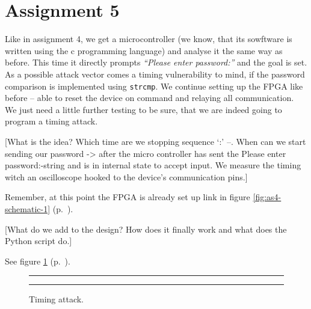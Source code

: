 \section*{Assignment 5}
%
% 

Like in assignment 4, we get a microcontroller (we know, that its sowftware is written using the c programming language) and analyse it the same way as before. 
This time it directly prompts \textit{``Please enter password:''} and the goal is set. As a possible attack vector comes a timing vulnerability to mind, if the password comparison is implemented using \texttt{strcmp}. We continue setting up the FPGA like before -- able to reset the device on command and relaying all communication. We just need a little further testing to be sure, that we are indeed going to program a timing attack.

[What is the idea? Which time are we stopping sequence `:' --. When can we start sending our password -> after the micro controller has sent the Please enter password:-string and is in internal state to accept input. We measure the timing witch an oscilloscope hooked to the device's communication pins.]

Remember, at this point the FPGA is already set up link in figure \ref{fig:as4-schematic-1} (p.~\pageref{fig:as4-schematic-1}).

[What do we add to the design? How does it finally work and what does the Python script do.]

See figure \ref{fig:as5-schematic} (p.~\pageref{fig:as5-schematic}).

\begin{figure}[hb]
    \begin{center}
        \hrule\vspace{1em}
        
        \caption{Timing attack.}
        \label{fig:as5-schematic}
        \vspace{1em}\hrule
    \end{center}
\end{figure}
